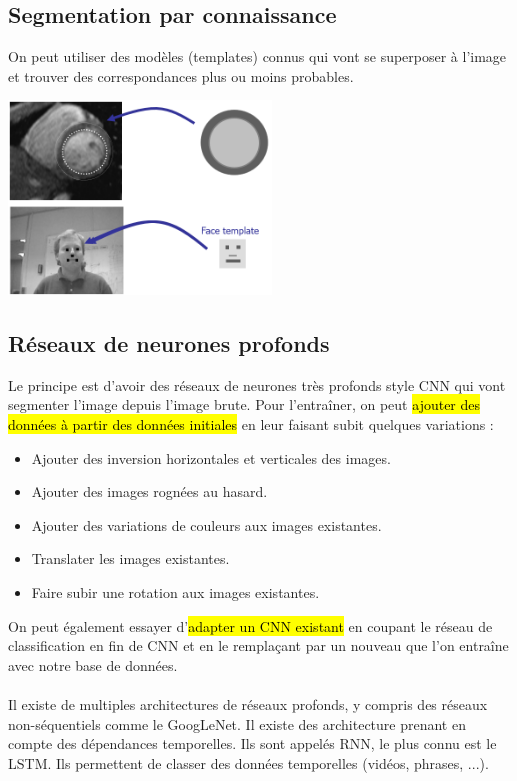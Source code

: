 \documentclass[letterpaper, 12pt]{article}
\newcommand{\alinea}{
\hspace*{0.5cm}}
\begin{document}
	\subsection{Segmentation par connaissance}
		\alinea On peut utiliser des modèles (templates) connus qui vont se superposer à l'image et trouver des correspondances
			plus ou moins probables.
		\begin{center}
			\includegraphics[width=2.75in]{Images/template}
		\end{center}
	\subsection{Réseaux de neurones profonds}
		\alinea Le principe est d'avoir des réseaux de neurones très profonds style CNN qui vont segmenter l'image depuis l'image brute.
			Pour l'entraîner, on peut \hl{ajouter des données à partir des données initiales} en leur faisant subit quelques variations : 
			\begin{itemize}
				\setlength\itemsep{0cm}
				\item Ajouter des inversion horizontales et verticales des images.
				\item Ajouter des images rognées au hasard.
				\item Ajouter des variations de couleurs aux images existantes.
				\item Translater les images existantes.
				\item Faire subir une rotation aux images existantes.
			\end{itemize}
		\alinea On peut également essayer d'\hl{adapter un CNN existant} en coupant le réseau de classification en fin de CNN et en le 
			remplaçant par un nouveau que l'on entraîne avec notre base de données.\\
		~\\
		\alinea Il existe de multiples architectures de réseaux profonds, y compris des réseaux non-séquentiels comme le GoogLeNet.
			Il existe des architecture prenant en compte des dépendances temporelles. Ils sont appelés RNN, le plus connu est le LSTM.
			Ils permettent de classer des données temporelles (vidéos, phrases, ...).
%
\end{document}
